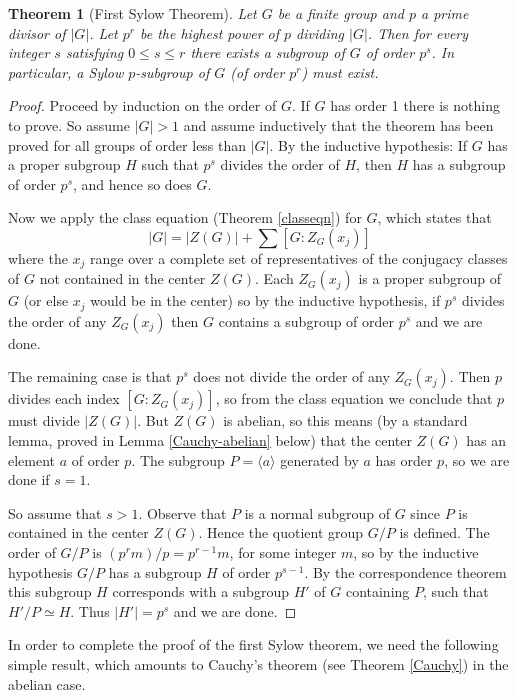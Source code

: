 \documentclass[11pt,oneside]{article}
\newtheorem{thm}{Theorem}[section]
\theoremstyle{definition}
\newcommand{\gen}[1]{\langle #1 \rangle}
\begin{document}
\begin{thm}[First Sylow Theorem]
Let $G$ be a finite group and $p$ a prime divisor of $|G|$. Let $p^r$
be the highest power of $p$ dividing $|G|$.  Then for every integer
$s$ satisfying $0\le s \le r$ there exists a subgroup of $G$ of order
$p^s$. In particular, a Sylow $p$-subgroup of $G$ (of order $p^r$)
must exist.
\end{thm}

\begin{proof}
Proceed by induction on the order of $G$. If $G$ has order 1 there is
nothing to prove. So assume $|G| > 1$ and assume inductively that the
theorem has been proved for all groups of order less than $|G|$. By
the inductive hypothesis: If $G$ has a proper subgroup $H$ such that
$p^s$ divides the order of $H$, then $H$ has a subgroup of order
$p^s$, and hence so does $G$.

Now we apply the class equation (Theorem \ref{classeqn}) for $G$,
which states that
\[
   \textstyle |G|=|Z(G)| + \sum [G:Z_G(x_j)]
\]
where the $x_j$ range over a complete set of representatives of the
conjugacy classes of $G$ not contained in the center $Z(G)$. Each
$Z_G(x_j)$ is a proper subgroup of $G$ (or else $x_j$ would be in the
center) so by the inductive hypothesis, if $p^s$ divides the order of
any $Z_G(x_j)$ then $G$ contains a subgroup of order $p^s$ and we are
done.

The remaining case is that $p^s$ does not divide the order of any
$Z_G(x_j)$. Then $p$ divides each index $[G:Z_G(x_j)]$, so from the
class equation we conclude that $p$ must divide $|Z(G)|$. But $Z(G)$
is abelian, so this means (by a standard lemma, proved in Lemma
\ref{Cauchy-abelian} below) that the center $Z(G)$ has an element $a$ of
order $p$. The subgroup $P = \gen{a}$ generated by $a$ has order $p$,
so we are done if $s=1$.

So assume that $s>1$. Observe that $P$ is a normal subgroup of $G$
since $P$ is contained in the center $Z(G)$. Hence the quotient group
$G/P$ is defined. The order of $G/P$ is $(p^rm)/p = p^{r-1}m$, for
some integer $m$, so by the inductive hypothesis $G/P$ has a subgroup
$H$ of order $p^{s-1}$. By the correspondence theorem this subgroup
$H$ corresponds with a subgroup $H'$ of $G$ containing $P$, such that
$H'/P \simeq H$. Thus $|H'| = p^s$ and we are done.
\end{proof}


In order to complete the proof of the first Sylow theorem, we need the
following simple result, which amounts to Cauchy's theorem (see
Theorem \ref{Cauchy}) in the abelian case.
\end{document}
